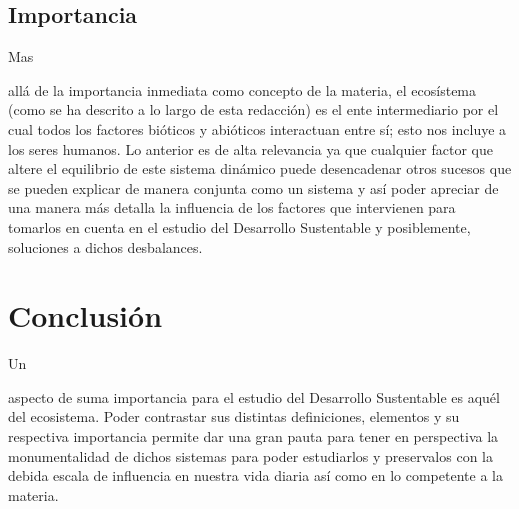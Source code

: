 \documentclass[stu, 12pt, letterpaper, donotrepeattitle, floatsintext, natbib]{apa7}
\begin{document}
\subsection{Importancia}
Mas \begin{justifying}
    allá de la importancia inmediata como concepto de la materia, el ecosístema (como se ha descrito a lo largo de esta redacción) es el ente
    intermediario por el cual todos los factores bióticos y abióticos interactuan entre sí; esto nos incluye a los seres humanos. Lo anterior es de alta relevancia ya que
    cualquier factor que altere el equilibrio de este sistema dinámico puede desencadenar otros sucesos \citep{rintoul-no-date} que se pueden explicar de manera conjunta como
    un sistema \citep{alburquerque-2018} y así poder apreciar de una manera más detalla la influencia de los factores que intervienen para tomarlos en cuenta en el estudio del Desarrollo Sustentable
    y posiblemente, soluciones a dichos desbalances.\par
\end{justifying}
\vspace{\baselineskip}
\section*{Conclusión}
Un \begin{justifying}
    aspecto de suma importancia para el estudio del Desarrollo Sustentable es aquél del ecosistema. Poder contrastar sus distintas definiciones, elementos y su respectiva importancia
   permite dar una gran pauta para tener en perspectiva la monumentalidad \citep{solar-sands-2021} de dichos sistemas para poder estudiarlos y preservalos con la debida escala de influencia en nuestra vida diaria así como en lo competente
   a la materia.\par 
\end{justifying}

\newpage
\setcounter{secnumdepth}{0} %
\renewcommand\refname{\textbf{Referencias}}

\end{document}
